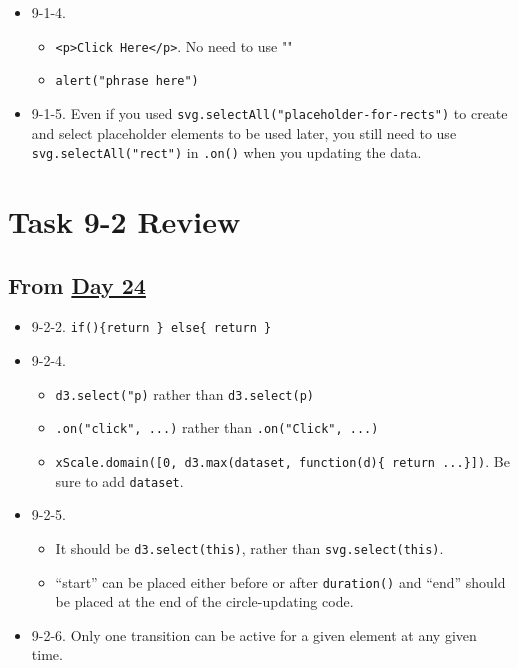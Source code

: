 \documentclass[
]{book}
\providecommand{\tightlist}{%
  \setlength{\itemsep}{0pt}\setlength{\parskip}{0pt}}
\begin{document}
\begin{itemize}
\tightlist
\item
  9-1-4.

  \begin{itemize}
  \tightlist
  \item
    \texttt{\textless{}p\textgreater{}Click\ Here\textless{}/p\textgreater{}}. No need to use ""
  \item
    \texttt{alert("phrase\ here")}
  \end{itemize}
\item
  9-1-5. Even if you used \texttt{svg.selectAll("placeholder-for-rects")} to create and select placeholder elements to be used later, you still need to use \texttt{svg.selectAll("rect")} in \texttt{.on()} when you updating the data.
\end{itemize}

\hypertarget{task-9-2-review}{%
\section{Task 9-2 Review}\label{task-9-2-review}}

\hypertarget{from-day-24-1}{%
\subsection{\texorpdfstring{From \href{https://observablehq.com/@hongtaoh/untitled}{Day 24}}{From Day 24}}\label{from-day-24-1}}

\begin{itemize}
\item
  9-2-2. \texttt{if()\{return\ \}\ else\{\ return\ \}}
\item
  9-2-4.

  \begin{itemize}
  \item
    \texttt{d3.select("p)} rather than \texttt{d3.select(p)}
  \item
    \texttt{.on("click",\ ...)} rather than \texttt{.on("Click",\ ...)}
  \item
    \texttt{xScale.domain({[}0,\ d3.max(dataset,\ function(d)\{\ return\ ...\}{]})}. Be sure to add \texttt{dataset}.
  \end{itemize}
\item
  9-2-5.

  \begin{itemize}
  \item
    It should be \texttt{d3.select(this)}, rather than \texttt{svg.select(this)}.
  \item
    ``start'' can be placed either before or after \texttt{duration()} and ``end'' should be placed at the end of the circle-updating code.
  \end{itemize}
\item
  9-2-6. Only one transition can be active for a given element at any given time.
\end{itemize}
\end{document}
